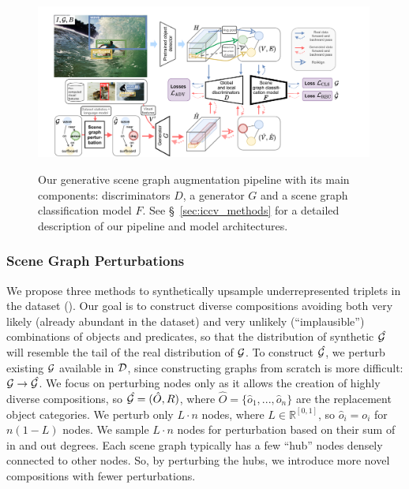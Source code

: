 \begin{figure}[tbph]
	\centering
	{\includegraphics[width=0.99\textwidth, trim={1cm 0cm 2cm 0.5cm}, clip]{overview}}
	\caption{\small Our generative scene graph augmentation pipeline with its main components: discriminators $D$, a generator $G$ and a scene graph classification model $F$. See \S~\ref{sec:iccv_methods} for a detailed description of our pipeline and model architectures.}
	\vspace{-5pt}
	\label{fig:iccv_overview}
\end{figure}

\subsubsection{Scene Graph Perturbations\label{sec:perturb}}

We propose three methods to synthetically upsample underrepresented triplets in the dataset (\fig{\ref{fig:perturb}}). 
Our goal is to construct diverse compositions avoiding both very likely (already abundant in the dataset) and very unlikely (``implausible'') combinations of objects and predicates, so that the distribution of synthetic $\mathit{\hat{\mathit{\cal G}}}$ will resemble the tail of the real distribution of $\mathit{\cal G}$.
To construct $\mathit{\hat{\mathit{\cal G}}}$, we perturb existing $\mathit{\cal G}$ available in $\cal D$, since constructing graphs from scratch is more difficult:
$\mathit{\cal G} \rightarrow \mathit{\hat{\mathit{\cal G}}}$. We focus on perturbing nodes only as it allows the creation of highly diverse compositions, so $\mathit{\hat{\mathit{\cal G}}}=(\hat{O}, R)$, where $\hat{O} = \{ \hat{o}_1, ..., \hat{o}_n\}$ are the replacement object categories. We perturb only $L\cdot n$ nodes, where $L \in \mathbb{R}^{[0,1]}$, so 
$\hat{o}_i = o_i$ for $n (1 - L)$ nodes.
We sample $L\cdot n$ nodes for perturbation based on their sum of in and out degrees. Each scene graph typically has a few ``hub'' nodes densely connected to other nodes.
So, by perturbing the hubs, we introduce more novel compositions with fewer perturbations.

